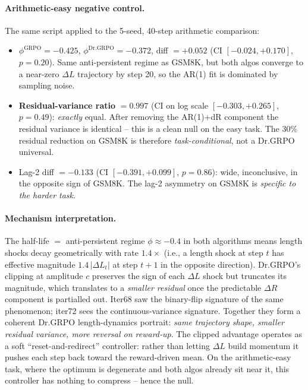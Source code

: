 \documentclass{article}
\begin{document}
\paragraph{Arithmetic-easy negative control.}
The same script applied to the 5-seed, 40-step arithmetic comparison:
\begin{itemize}
\item $\phi^{\mathrm{GRPO}} = -0.425$, $\phi^{\mathrm{Dr.GRPO}} = -0.372$,
      diff $= +0.052$ (CI $[-0.024, +0.170]$, $p = 0.20$). Same
      anti-persistent regime as GSM8K, but both algos converge to a
      near-zero $\Delta L$ trajectory by step 20, so the AR(1) fit is
      dominated by sampling noise.
\item \textbf{Residual-variance ratio} $= 0.997$ (CI on log scale
      $[-0.303, +0.265]$, $p = 0.49$): \emph{exactly} equal. After
      removing the AR(1)+dR component the residual variance is
      identical -- this is a clean null on the easy task. The 30\%
      residual reduction on GSM8K is therefore \emph{task-conditional},
      not a Dr.GRPO universal.
\item Lag-2 diff $= -0.133$ (CI $[-0.391, +0.099]$, $p = 0.86$): wide,
      inconclusive, in the opposite sign of GSM8K. The lag-2
      asymmetry on GSM8K is \emph{specific to the harder task}.
\end{itemize}

\paragraph{Mechanism interpretation.}
The half-life $=$ anti-persistent regime $\phi \approx -0.4$ in both
algorithms means length shocks decay geometrically with rate
$1.4 \times$ (i.e., a length shock at step $t$ has effective magnitude
$1.4\,|\Delta L_t|$ at step $t+1$ in the opposite direction).
Dr.GRPO's clipping at amplitude $c$ preserves the sign of each
$\Delta L$ shock but truncates its magnitude, which translates to a
\emph{smaller residual} once the predictable $\Delta R$ component is
partialled out. Iter68 saw the binary-flip signature of the same
phenomenon; iter72 sees the continuous-variance signature.
Together they form a coherent Dr.GRPO length-dynamics portrait:
\emph{same trajectory shape, smaller residual variance, more reversal
on reward-up}. The clipped advantage operates as a soft
``reset-and-redirect'' controller: rather than letting $\Delta L$ build
momentum it pushes each step back toward the reward-driven mean. On
the arithmetic-easy task, where the optimum is degenerate and both
algos already sit near it, this controller has nothing to compress --
hence the null.
\end{document}
